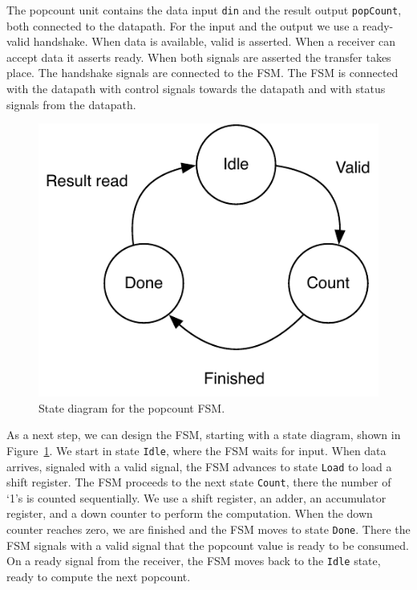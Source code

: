 \documentclass[%
    10pt,
    headinclude, footexclude,
    openright, %
    notitlepage,
    cleardoubleempty,
    headsepline,
    pointlessnumbers,
    bibtotoc, idxtotoc,
    ]{scrbook}
\newcommand{\code}[1]{{\small{\texttt{#1}}}}
\newcommand{\scale}{0.7}
\begin{document}
The popcount unit contains the data input \code{din} and the result output \code{popCount},
both connected to the datapath. For the input and the output we use a ready-valid handshake.
When data is available, valid is asserted. When a receiver can accept data it asserts ready.
When both signals are asserted the transfer takes place. The handshake signals are connected
to the FSM. The FSM is connected with the datapath with control signals towards the datapath
and with status signals from the datapath.

\begin{figure}
  \centering
  \includegraphics[scale=\scale]{figures/popcnt-states}
  \caption{State diagram for the popcount FSM.}
  \label{fig:popcnt-states}
\end{figure}

As a next step, we can design the FSM, starting with a state diagram, shown in
Figure~\ref{fig:popcnt-states}. We start in state \code{Idle}, where the FSM waits
for input. When data arrives, signaled with a valid signal, the FSM advances to state \code{Load}
to load a shift register. The FSM proceeds to the next state \code{Count}, there the number
of `1's is counted sequentially. We use a shift register, an adder, an accumulator
register, and a down counter to perform the computation. When the down counter reaches
zero, we are finished and the FSM moves to state \code{Done}. There the FSM signals with a valid
signal that the popcount value is ready to be consumed. On a ready signal from the
receiver, the FSM moves back to the \code{Idle} state, ready to compute the next popcount.
\end{document}

